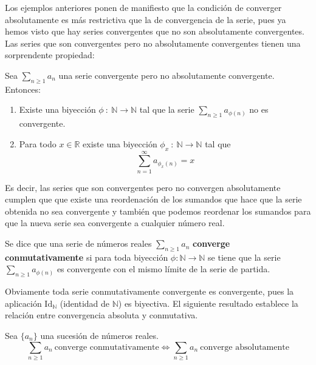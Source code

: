 Los ejemplos anteriores ponen de manifiesto que la condición de converger absolutamente es más restrictiva que la de convergencia de la serie, pues ya hemos visto que hay series convergentes que no son absolutamente convergentes.\\

Las series que son convergentes pero no absolutamente convergentes tienen una sorprendente propiedad:
\begin{teo}[de Riemann]
    Sea $\displaystyle\sum_{n \geq 1} a_n$ una serie convergente pero no absolutamente convergente. Entonces:
    \begin{enumerate}
        \item Existe una biyección $\phi ~:~ \mathbb{N} \longrightarrow \mathbb{N}$ tal que la serie $\displaystyle\sum_{n \geq 1} a_{\phi(n)}$ no es convergente.

        \item Para todo $x \in \mathbb{R}$ existe una biyección $\phi_x ~:~ \mathbb{N} \longrightarrow \mathbb{N}$ tal que
        \begin{equation*}
            \displaystyle\sum_{n = 1}^{\infty} a_{\phi_x(n)} = x
        \end{equation*}
    \end{enumerate}
\end{teo}

Es decir, las series que son convergentes pero no convergen absolutamente cumplen que que existe una reordenación de los sumandos que hace que la serie obtenida no sea convergente
y también que podemos reordenar los sumandos para que la nueva serie sea convergente a cualquier número real.

\begin{definicion}
    Se dice que una serie de números reales $\sum_{n \geq 1} a_n$ \textbf{converge conmutativamente} si para toda biyección $\phi : \mathbb{N} \longrightarrow \mathbb{N}$ se tiene que la serie $\sum_{n \geq 1} a_{\phi(n)}$ es convergente con el mismo límite de la serie de partida.
\end{definicion}

Obviamente toda serie conmutativamente convergente es convergente, pues la aplicación $\text{Id}_{\mathbb{N}}$ (identidad de $\mathbb{N}$)  es biyectiva. El siguiente resultado establece la relación entre convergencia absoluta y conmutativa.

\begin{teo}
    Sea $\{a_n\}$ una sucesión de números reales.
    \begin{equation*}
        \displaystyle\sum_{n \geq 1} a_n ~ \text{converge conmutativamente} \Longleftrightarrow \displaystyle\sum_{n \geq 1} a_n ~ \text{converge absolutamente}
    \end{equation*}
\end{teo}

